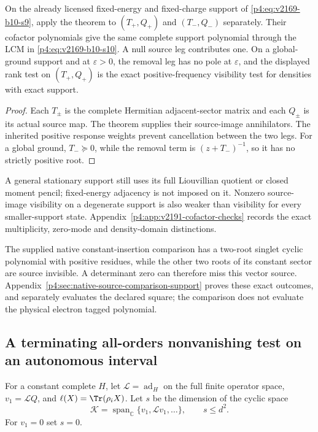 \documentclass[12pt,a4paper]{article}
\begin{document}
\begin{corollary}
\label{p4:cor:v2191-adjacent-cofactor}
On the already licensed fixed-energy and fixed-charge support of
\eqref{p4:eq:v2169-b10-s9}, apply the theorem to
$(T_+,Q_+)$ and $(T_-,Q_-)$ separately. Their cofactor polynomials give
the same complete support polynomial through the LCM in
\eqref{p4:eq:v2169-b10-s10}. A null source leg contributes one.
On a global-ground support and at $\varepsilon>0$, the removal leg has no
pole at $\varepsilon$, and the displayed rank test on $(T_+,Q_+)$ is the
exact positive-frequency visibility test for densities with exact support.
\end{corollary}
\begin{proof}
Each $T_\pm$ is the complete Hermitian adjacent-sector matrix and each
$Q_\pm$ is its actual source map. The theorem supplies their source-image
annihilators. The inherited positive response weights prevent cancellation
between the two legs. For a global ground, $T_-\succeq0$, while the removal
term is $(z+T_-)^{-1}$, so it has no strictly positive root.
\end{proof}

A general stationary support still uses its full Liouvillian quotient or
closed moment pencil; fixed-energy adjacency is not imposed on it.
Nonzero source-image visibility on a degenerate support is also weaker than
visibility for every smaller-support state. Appendix~\ref{p4:app:v2191-cofactor-checks}
records the exact multiplicity, zero-mode and density-domain distinctions.



The supplied native constant-insertion comparison has a two-root singlet
cyclic polynomial with positive residues, while the other two roots of
its constant sector are source invisible. A determinant zero can therefore
miss this vector source. Appendix~\ref{p4:sec:native-source-comparison-support}
proves these exact outcomes, and separately evaluates the declared square;
the comparison does not evaluate the physical electron tagged polynomial.




\subsection{A terminating all-orders nonvanishing test on an autonomous interval}
For a constant complete $H$, let $\mathcal L=\operatorname{ad}_H$ on the full finite
operator space, $v_1=\mathcal LQ$, and
$\ell(X)=\Tr(\rho_iX)$. Let $s$ be the dimension of the cyclic space
\[
 \mathcal K=\operatorname{span}_{\mathbb C}
 \{v_1,\mathcal Lv_1,\ldots\},\qquad s\leq d^2.
\]
For $v_1=0$ set $s=0$.
\end{document}
